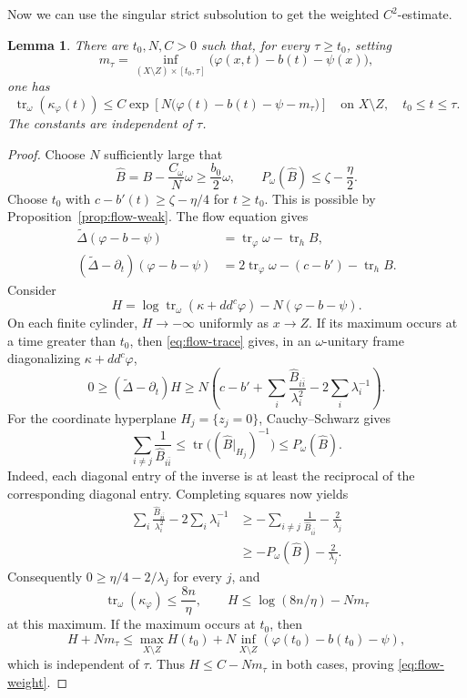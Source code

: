 \documentclass[reqno]{amsart}
\numberwithin{equation}{section}
\newtheorem{lemma}[theorem]{Lemma}
\theoremstyle{definition}
\DeclareMathOperator{\tr}{tr}
\newcommand{\ddc}{dd^c}
\begin{document}
Now we can use the singular strict subsolution to get the weighted $C^2$-estimate. 
\begin{lemma}\label{lem:flow-weight} There are $t_0,N,C>0$ such that, for every
$\tau\ge t_0$, setting
\[
 m_\tau=\inf_{(X\setminus Z)\times[t_0,\tau]}
                    \bigl(\varphi(x,t)-b(t)-\psi(x)\bigr),
\]
one has
\begin{equation}\label{eq:flow-weight}
 \tr_\omega(\kappa_\varphi(t))
 \le C\exp\!\left[N\bigl(\varphi(t)-b(t)-\psi-m_\tau\bigr)\right]
 \quad\text{on }X\setminus Z,\quad t_0\le t\le\tau.
\end{equation}
The constants are independent of $\tau$.
\end{lemma}
\begin{proof}
Choose $N$ sufficiently large that
\[
 \widehat B=B-\frac{C_\omega}{N}\omega\ge\frac{b_0}{2}\omega,
 \qquad P_\omega(\widehat B)\le\zeta-\frac\eta2.
\]
Choose $t_0$ with $c-b'(t)\ge\zeta-\eta/4$ for $t\ge t_0$. This is possible by Proposition~\ref{prop:flow-weak}.
The flow equation gives
\[
 \begin{aligned}
 \widetilde\Delta(\varphi-b-\psi)
   &=\tr_{\varphi}\omega-\tr_h B,\\
 (\widetilde\Delta-\partial_t)(\varphi-b-\psi)
   &=2\tr_{\varphi}\omega-(c-b')-\tr_h B.
 \end{aligned}
\]
Consider
\[
 H=\log\tr_\omega(\kappa+\ddc\varphi)-N(\varphi-b-\psi).
\]
On each finite cylinder, $H\to-\infty$ uniformly as $x\to Z$.
If its maximum occurs at a time greater than $t_0$, then
\eqref{eq:flow-trace} gives, in an $\omega$-unitary frame diagonalizing
$\kappa+\ddc\varphi$,
\begin{equation}\label{eq:flow-maximum}
 0\ge(\widetilde\Delta-\partial_t)H
 \ge N\left(c-b'
      +\sum_i\frac{\widehat B_{i\bar i}}{\lambda_i^2}
      -2\sum_i\lambda_i^{-1}\right).
\end{equation}
For the coordinate hyperplane $H_j=\{z_j=0\}$, Cauchy--Schwarz
gives
\begin{equation}\label{eq:diagonal-compression}
 \sum_{i\ne j}\frac1{\widehat B_{i\bar i}}
 \le\tr\bigl((\widehat B|_{H_j})^{-1}\bigr)
 \le P_\omega(\widehat B).
\end{equation}
Indeed, each diagonal entry of the inverse is at least the reciprocal
of the corresponding diagonal entry. Completing squares now yields
\[
 \begin{aligned}
 \sum_i\frac{\widehat B_{i\bar i}}{\lambda_i^2}
       -2\sum_i\lambda_i^{-1}
 &\ge-\sum_{i\ne j}\frac1{\widehat B_{i\bar i}}
       -\frac2{\lambda_j}\\
 &\ge-P_\omega(\widehat B)-\frac2{\lambda_j}.
 \end{aligned}
\]
Consequently $0\ge\eta/4-2/\lambda_j$ for every $j$, and
\[
 \tr_\omega(\kappa_\varphi)\le\frac{8n}{\eta},
 \qquad H\le\log(8n/\eta)-Nm_\tau
\]
at this maximum. If the maximum occurs at $t_0$, then
\[
 H+Nm_\tau
 \le\max_{X\setminus Z}H(t_0)
      +N\inf_{X\setminus Z}(\varphi(t_0)-b(t_0)-\psi),
\]
which is independent of $\tau$. Thus $H\le C-Nm_\tau$ in both cases,
proving \eqref{eq:flow-weight}.
\end{proof}
\end{document}
